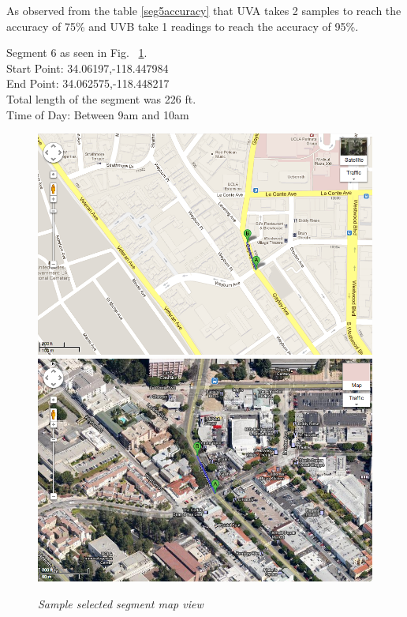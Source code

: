 \documentclass[12pt,fullpage,doublespace]{article}
\begin{document}
As observed from the table \ref{seg5accuracy} that UVA takes 2 samples to reach the accuracy of 75\% and UVB take 1 readings to reach the accuracy of 95\%. 
\newpage\newpage
\begin{center}
Segment 6 as seen in Fig. ~\ref{fig:segment6}. \\
Start Point:  34.06197,-118.447984\\
End Point:  34.062575,-118.448217 \\
Total length of the segment was 226 ft.\\
Time of Day: Between 9am and 10am\\
\begin{figure}[h]
\begin{center}
\includegraphics[scale=0.32]{segment6a.png}
\includegraphics[scale=0.32]{segment6b.png}
\caption{\small \sl Sample selected segment map view}\label{fig:segment6}
\end{center}
\end{figure}
\end{center}
\end{document}
